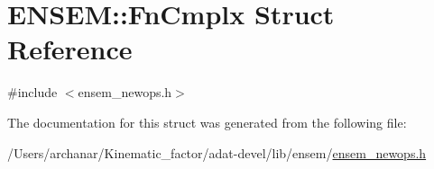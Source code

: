 \hypertarget{structENSEM_1_1FnCmplx}{}\section{E\+N\+S\+EM\+:\+:Fn\+Cmplx Struct Reference}
\label{structENSEM_1_1FnCmplx}


{\ttfamily \#include $<$ensem\+\_\+newops.\+h$>$}



The documentation for this struct was generated from the following file\+:\begin{DoxyCompactItemize}
\item 
/\+Users/archanar/\+Kinematic\+\_\+factor/adat-\/devel/lib/ensem/\mbox{\hyperlink{adat-devel_2lib_2ensem_2ensem__newops_8h}{ensem\+\_\+newops.\+h}}\end{DoxyCompactItemize}
